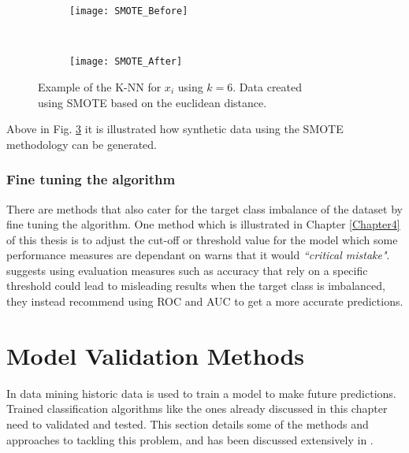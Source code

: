 \begin{figure}[H]
	\centering
	\begin{subfigure}[b]{0.32\textwidth}
		\captionsetup{font=scriptsize}
		\texttt{[image: SMOTE\_Before]}\caption{}
		\label{fig:SMOTE_Before}
	\end{subfigure}  ~\quad
	\begin{subfigure}[b]{0.32\textwidth}
		\captionsetup{font=scriptsize}
		\texttt{[image: SMOTE\_After]}
		\caption{}
		\label{fig:SMOTE_After}
	\end{subfigure}
	\caption{Example of the K-NN for $x_i$ using $k = 6$. Data created \\ using SMOTE based on the euclidean distance.\\
		\cite[Source:][]{he_learning_2009}}
	\label{fig:smoteExample}
\end{figure}

Above in Fig. \ref{fig:smoteExample} it is illustrated how synthetic data using the SMOTE methodology can be generated.


\subsubsection{Fine tuning the algorithm}
There are methods that also cater for the target class imbalance of the dataset by fine tuning the algorithm. One method which is illustrated in Chapter \ref{Chapter4} of this thesis is to adjust the cut-off or threshold value for the model which some performance measures are dependant on \cite{provost_machine_2000} warns that it would \textit{``critical mistake"}. \cite{chawla_editorial:_2004} suggests using evaluation measures such as accuracy that rely on a specific threshold could lead to misleading results when the target class is imbalanced, they instead recommend using ROC and AUC to get a more accurate predictions.


\section{Model Validation Methods}\label{sec:modelValid}
In data mining historic data is used to train a model to make future predictions. Trained classification algorithms like the ones already discussed in this chapter need to validated and tested. This section details some of the methods and approaches to tackling this problem, and has been discussed extensively in \citep{refaeilzadeh_cross-validation_2009}.

